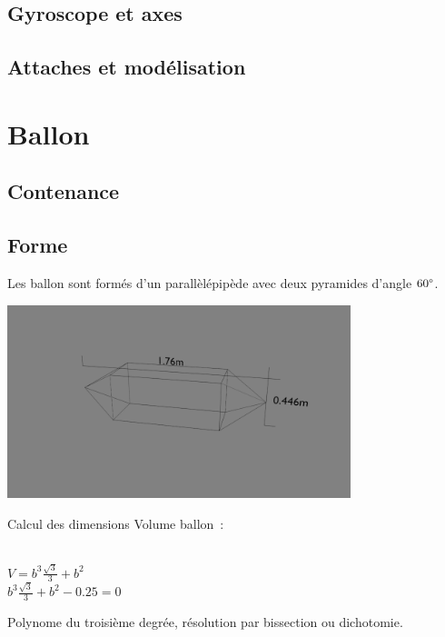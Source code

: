 \documentclass{beamer}
\begin{document}
\subsection{Gyroscope et axes}

\begin{frame}
  
\end{frame}

\subsection{Attaches et modélisation}

\section{Ballon}

\subsection{Contenance}

\subsection{Forme}

\begin{frame}
  Les ballon sont formés d'un parallèlépipède avec deux pyramides d'angle $60\degree$. \\
  \begin{center}
    \includegraphics[width=10cm]{../Images/ballon.png}
  \end{center}
\end{frame}

\begin{frame}{Calcul des dimensions}
  Volume ballon~:
  \begin{center}
     \\
    $\displaystyle{V = b^3 \frac{\sqrt{3}}{3} + b^2}$ \\
    $\displaystyle{b^3 \frac{\sqrt{3}}{3} + b^2 - 0.25 = 0}$
  \end{center}
  Polynome du troisième degrée, résolution par bissection ou dichotomie.
\end{frame}
\end{document}
